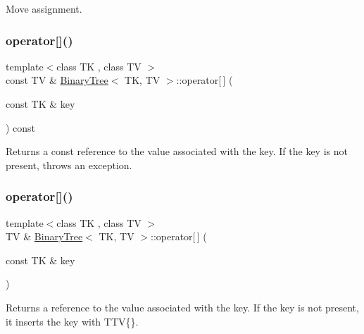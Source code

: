 Move assignment. \mbox{\label{classBinaryTree_ab5087864bf9bd49c1e5a79640066e34e}} 
\subsubsection{\texorpdfstring{operator[]()}{operator[]()}\hspace{0.1cm}{\footnotesize\ttfamily [1/2]}}
{\footnotesize\ttfamily template$<$class TK , class TV $>$ \\
const TV \& \mbox{\hyperlink{classBinaryTree}{Binary\+Tree}}$<$ TK, TV $>$\+::operator\mbox{[}$\,$\mbox{]} (\begin{DoxyParamCaption}\item[{const TK \&}]{key }\end{DoxyParamCaption}) const}

Returns a const reference to the value associated with the key. If the key is not present, throws an exception. \mbox{\label{classBinaryTree_a21bebae9adf0939f622b2bb47540694a}} 
\subsubsection{\texorpdfstring{operator[]()}{operator[]()}\hspace{0.1cm}{\footnotesize\ttfamily [2/2]}}
{\footnotesize\ttfamily template$<$class TK , class TV $>$ \\
TV \& \mbox{\hyperlink{classBinaryTree}{Binary\+Tree}}$<$ TK, TV $>$\+::operator\mbox{[}$\,$\mbox{]} (\begin{DoxyParamCaption}\item[{const TK \&}]{key }\end{DoxyParamCaption})}

Returns a reference to the value associated with the key. If the key is not present, it inserts the key with T\+TV\{\}. \mbox{\label{classBinaryTree_a59ebcb199618fe76be5f3a9c813c95c9}} 
